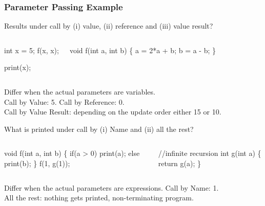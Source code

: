 \documentclass{beamer}
\begin{document}
\begin{frame}[fragile,t]
   \frametitle{Parameter Passing Example}


\begin{block}{Results under call by (i) value, (ii) reference and (iii) value result? }
\begin{columns}
\vspace{-2ex}
\begin{colorcode}[fontsize=\scriptsize]
int x = 5;
f(x, x);

print(x);
\end{colorcode} 
\vspace{-2ex}
\begin{colorcode}[fontsize=\scriptsize]
void f(int a, int b) \{
    a = 2*a + b;
    b =   a - b;
\}
\end{colorcode}
\end{columns}
\end{block}

\smallskip
Differ when the actual parameters are variables.\\
Call by Value: 5. Call by Reference: 0.\\
Call by Value Result: depending on the update order either 15 or 10.
\smallskip

\begin{block}{What is printed under call by (i) Name and (ii) all the rest? }
\begin{columns}
\vspace{-2ex}
\begin{colorcode}[fontsize=\scriptsize]
void f(int a, int b) \{
  if(a > 0) print(a); else print(b);
\}
f(1, g(1));
\end{colorcode} 
\vspace{-2ex}
\begin{colorcode}[fontsize=\scriptsize]
//\alert{infinite recursion}
int g(int a) \{
  return g(a);
\}
\end{colorcode}
\end{columns}
\end{block}

\smallskip
Differ when the actual parameters are expressions. Call by Name: 1.\\
All the rest: nothing gets printed, non-terminating program.

\end{frame}
\end{document}
